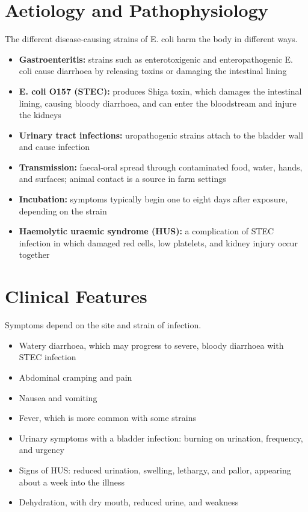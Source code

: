 \section*{Aetiology and Pathophysiology}
The different disease-causing strains of E. coli harm the body in different ways.
\begin{itemize}
    \item \textbf{Gastroenteritis:} strains such as enterotoxigenic and enteropathogenic E. coli cause diarrhoea by releasing toxins or damaging the intestinal lining
    \item \textbf{E. coli O157 (STEC):} produces Shiga toxin, which damages the intestinal lining, causing bloody diarrhoea, and can enter the bloodstream and injure the kidneys
    \item \textbf{Urinary tract infections:} uropathogenic strains attach to the bladder wall and cause infection
    \item \textbf{Transmission:} faecal-oral spread through contaminated food, water, hands, and surfaces; animal contact is a source in farm settings
    \item \textbf{Incubation:} symptoms typically begin one to eight days after exposure, depending on the strain
    \item \textbf{Haemolytic uraemic syndrome (HUS):} a complication of STEC infection in which damaged red cells, low platelets, and kidney injury occur together
\end{itemize}

\section*{Clinical Features}
Symptoms depend on the site and strain of infection.
\begin{itemize}
    \item Watery diarrhoea, which may progress to severe, bloody diarrhoea with STEC infection
    \item Abdominal cramping and pain
    \item Nausea and vomiting
    \item Fever, which is more common with some strains
    \item Urinary symptoms with a bladder infection: burning on urination, frequency, and urgency
    \item Signs of HUS: reduced urination, swelling, lethargy, and pallor, appearing about a week into the illness
    \item Dehydration, with dry mouth, reduced urine, and weakness
\end{itemize}

